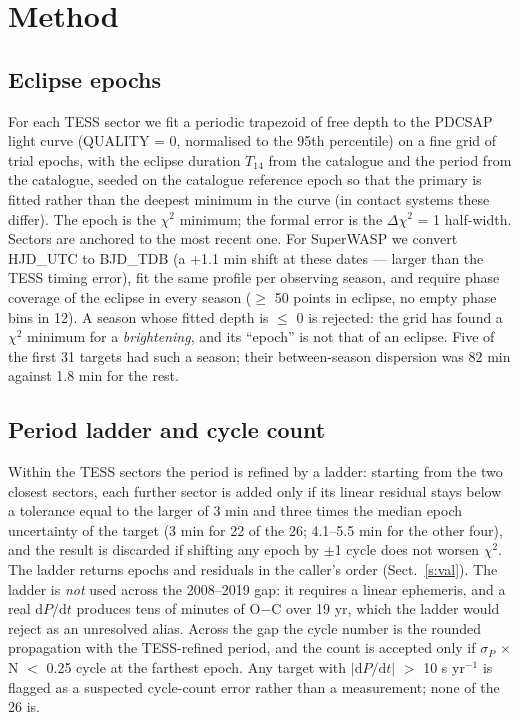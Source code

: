\documentclass{aa}
\begin{document}
\section{Method}\label{s:met}

\subsection{Eclipse epochs}\label{ss:epocas}
For each TESS sector we fit a periodic trapezoid of free depth to the PDCSAP light curve (QUALITY = 0, normalised to the 95th percentile) on a fine grid of trial epochs, with the eclipse duration $T_{14}$ from the catalogue and the period from the catalogue, seeded on the catalogue reference epoch so that the primary is fitted rather than the deepest minimum in the curve (in contact systems these differ). The epoch is the $\chi^2$ minimum; the formal error is the $\Delta\chi^2$ = 1 half-width. Sectors are anchored to the most recent one.
For SuperWASP we convert HJD\_UTC to BJD\_TDB (a +1.1 min shift at these dates --- larger than the TESS timing error), fit the same profile per observing season, and require phase coverage of the eclipse in every season ($\ge$ 50 points in eclipse, no empty phase bins in 12). A season whose fitted depth is $\le$ 0 is rejected: the grid has found a $\chi^2$ minimum for a \emph{brightening}, and its ``epoch'' is not that of an eclipse. Five of the first 31 targets had such a season; their between-season dispersion was 82 min against 1.8 min for the rest.

\subsection{Period ladder and cycle count}\label{ss:escada}
Within the TESS sectors the period is refined by a ladder: starting from the two closest sectors, each further sector is added only if its linear residual stays below a tolerance equal to the larger of 3 min and three times the median epoch uncertainty of the target (3 min for 22 of the 26; 4.1--5.5 min for the other four), and the result is discarded if shifting any epoch by $\pm$1 cycle does not worsen $\chi^2$. The ladder returns epochs and residuals in the caller's order (Sect.~\ref{s:val}).
The ladder is \emph{not} used across the 2008--2019 gap: it requires a linear ephemeris, and a real $\mathrm{d}P/\mathrm{d}t$ produces tens of minutes of O$-$C over 19 yr, which the ladder would reject as an unresolved alias. Across the gap the cycle number is the rounded propagation with the TESS-refined period, and the count is accepted only if $\sigma_P$ $\times$ N $<$ 0.25 cycle at the farthest epoch. Any target with $|\mathrm{d}P/\mathrm{d}t|$ $>$ 10 s yr$^{-1}$ is flagged as a suspected cycle-count error rather than a measurement; none of the 26 is.
\end{document}
